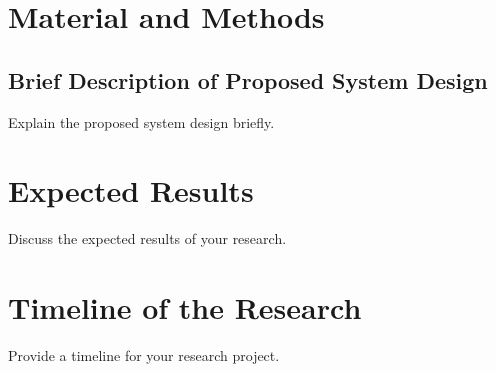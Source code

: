 \newpage
\section{Material and Methods}
\subsection{Brief Description of Proposed System Design}
Explain the proposed system design briefly.

\newpage
\section{Expected Results}
Discuss the expected results of your research.

\newpage
\section{Timeline of the Research}
Provide a timeline for your research project.